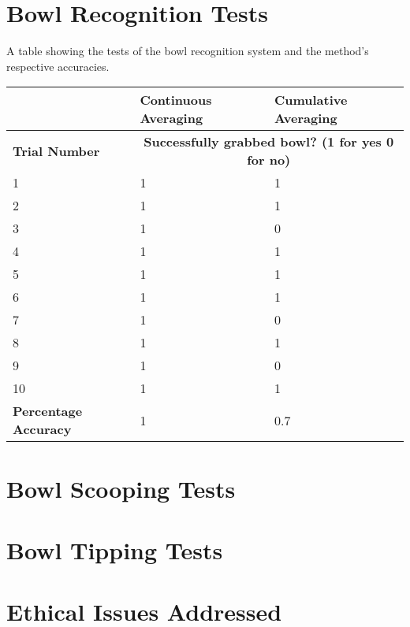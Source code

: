 \begin{appendices}
\let\cleardoublepage\clearpage
\chapter{Bowl Recognition Tests}
\label{chap:AppendixA}
A table showing the tests of the bowl recognition system and the method's respective accuracies.\newline\newline
\begin{tabular}{ | l | l | l | }
\hline
	 & \textbf{Continuous Averaging} & \textbf{Cumulative Averaging} \\ \hline
	\textbf{Trial Number} & \multicolumn{2}{|c|}{\textbf{Successfully grabbed bowl? (1 for yes 0 for no)} } \\ \hline
	1 & 1 & 1 \\ \hline
	2 & 1 & 1 \\ \hline
	3 & 1 & 0 \\ \hline
	4 & 1 & 1 \\ \hline
	5 & 1 & 1 \\ \hline
	6 & 1 & 1 \\ \hline
	7 & 1 & 0 \\ \hline
	8 & 1 & 1 \\ \hline
	9 & 1 & 0 \\ \hline
	10 & 1 & 1 \\ \hline
	\textbf{Percentage Accuracy} & 1 & 0.7 \\ \hline
\end{tabular}
\chapter{Bowl Scooping Tests}
\label{chap:AppendixB}
\chapter{Bowl Tipping Tests}
\label{chap:AppendixC}
\chapter{Ethical Issues Addressed}
\end{appendices}